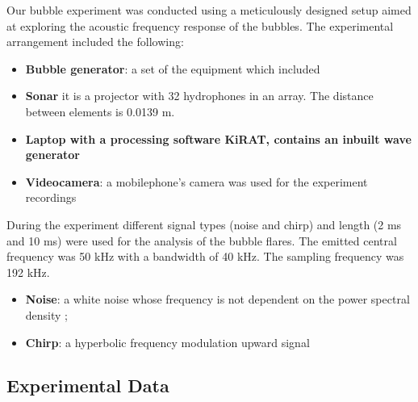 Our bubble experiment was conducted using a meticulously designed setup aimed at exploring the acoustic frequency response of the bubbles. The experimental arrangement included the following:
\begin{itemize}
    \item \textbf{Bubble generator}: a set of the equipment which included
    \item \textbf{Sonar} it is a projector with 32 hydrophones in an array. The distance between elements is 0.0139 m.
    \item \textbf{Laptop with a processing software KiRAT, contains an inbuilt wave generator}
    \item \textbf{Videocamera}: a mobilephone's camera was used for the experiment recordings
\end{itemize}

During the experiment different signal types (noise and chirp) and length (2 ms and 10 ms) were used for the analysis of the bubble flares. The emitted central frequency was 50 kHz with a bandwidth of 40 kHz. The sampling frequency was 192 kHz.
\begin{itemize}
    \item \textbf{Noise}: a white noise whose frequency is not dependent on the power spectral density \cite*{ainslie_principles_2010};  
    \item \textbf{Chirp}: a hyperbolic frequency modulation upward signal 
\end{itemize}




 

\subsection{Experimental Data}



